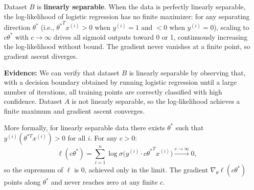 \begin{answer}
Dataset $B$ is \textbf{linearly separable}. When the data is perfectly linearly separable, the log-likelihood of logistic regression has no finite maximizer: for any separating direction $\theta^*$ (i.e., ${\theta^*}^T x^{(i)} > 0$ when $y^{(i)}=1$ and $< 0$ when $y^{(i)}=0$), scaling to $c\theta^*$ with $c \to \infty$ drives all sigmoid outputs toward 0 or 1, continuously increasing the log-likelihood without bound. The gradient never vanishes at a finite point, so gradient ascent diverges.

\textbf{Evidence:} We can verify that dataset $B$ is linearly separable by observing that, with a decision boundary obtained by running logistic regression until a large number of iterations, all training points are correctly classified with high confidence. Dataset $A$ is not linearly separable, so the log-likelihood achieves a finite maximum and gradient ascent converges.

More formally, for linearly separable data there exists $\theta^*$ such that $y^{(i)}(\theta^{*T} x^{(i)}) > 0$ for all $i$. For any $c > 0$:
$$\ell(c\theta^*) = \sum_{i=1}^n \log \sigma\!\bigl(y^{(i)} \cdot c{\theta^*}^T x^{(i)}\bigr) \xrightarrow{c\to\infty} 0,$$
so the supremum of $\ell$ is 0, achieved only in the limit. The gradient $\nabla_\theta \ell(c\theta^*)$ points along $\theta^*$ and never reaches zero at any finite $c$.
\end{answer}
